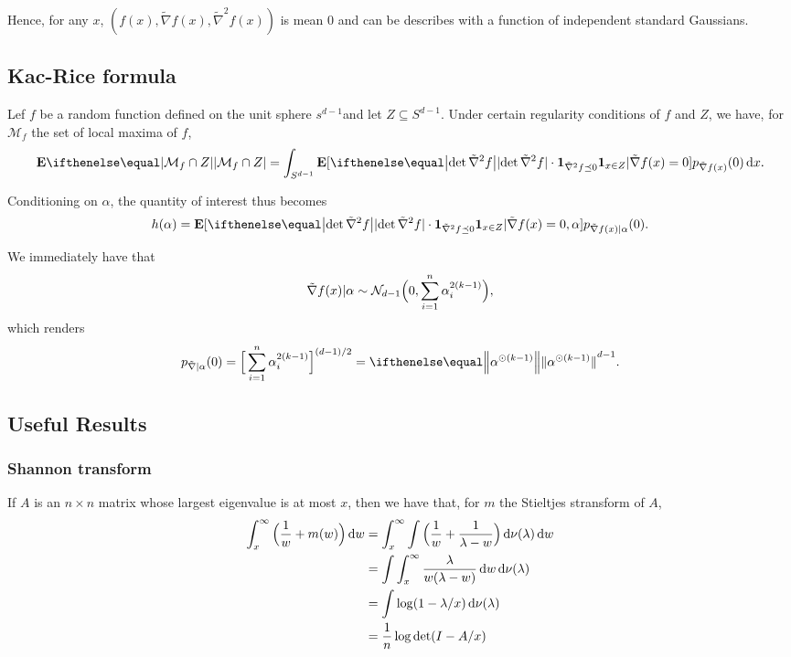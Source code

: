 \documentclass{hw-scrartcl}
\begin{document}
Hence, for any \(x\), \((f(x), \tilde{\nabla}f(x), \tilde{\nabla}^2 f(x))\) is mean \(0\) and can be describes with a function of independent standard Gaussians.

\subsection{Kac-Rice formula}
\begin{lemma}
  Lef \(f\) be a random function defined on the unit sphere \(s^{d-1}\)and let \(Z \subseteq S^{d-1}\). Under certain regularity conditions of \(f\) and \(Z\), we have, for \(\mathcal{M}_f\) the set of local maxima of \(f\),
  \[
    \E\abs{\mathcal{M}_f \cap Z}
    = \int_{S^{d-1}} \E[\abs{\det \tilde{\nabla}^2 f} \cdot \ind_{\tilde{\nabla}^2 f \preceq 0} \ind_{x \in Z} | \tilde{\nabla} f(x) = 0] p_{\tilde{\nabla} f(x)}(0) \diff x.
    \]
\end{lemma}

Conditioning on \(\alpha\), the quantity of interest thus becomes
\[
  h(\alpha)
  =  \E[\abs{\det \tilde{\nabla}^2 f} \cdot \ind_{\tilde{\nabla}^2 f \preceq 0} \ind_{x \in Z} | \tilde{\nabla} f(x) = 0, \alpha] p_{\tilde{\nabla} f(x)|\alpha}(0).
\]

We immediately have that
\[
  \tilde{\nabla} f(x) | \alpha
  \sim \mathcal{N}_{d-1}\Big(0, \sum_{i=1}^n \alpha_i^{2(k-1)}\Big),
\]
which renders
\[
  p_{\tilde{\nabla}|\alpha}(0)
  = \Big[\sum_{i=1}^n \alpha_i^{2(k-1)}\Big]^{(d-1)/2}
  = \norm{\alpha^{\odot (k-1)}}^{d-1}.
\]

\subsection{Useful Results}
\subsubsection{Shannon transform}
If \(A\) is an \(n\times n\) matrix whose largest eigenvalue is at most \(x\), then we have that, for \(m\) the Stieltjes stransform of \(A\),
\begin{align*}
  \int_x^\infty \Big(\frac{1}{w} + m(w)\Big) \mathop{}\!\mathrm{d} w
  &= \int_x^\infty \int \Big(\frac{1}{w} + \frac{1}{\lambda - w}\Big) \mathop{}\!\mathrm{d} \nu(\lambda) \mathop{}\!\mathrm{d} w \\
  &= \int \int_x^\infty \frac{\lambda}{w(\lambda - w)} \mathop{}\!\mathrm{d} w \mathop{}\!\mathrm{d} \nu(\lambda) \\
  &= \int \log(1 - \lambda/x) \mathop{}\!\mathrm{d} \nu(\lambda) \\
  &= \frac{1}{n} \log \det(I - A/x)
\end{align*}
\end{document}
